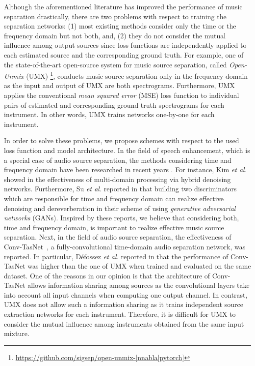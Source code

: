 \documentclass{article}
\begin{document}
Although the aforementioned literature has improved the performance of music separation drastically, there are two problems with respect to training the separation networks: (1) most existing methods consider only the time or the frequency domain but not both, and, (2) they do not consider the mutual influence among output sources since loss functions are independently applied to each estimated source and the corresponding ground truth.
For example, one of the state-of-the-art open-source system for music source separation, called \emph{Open-Unmix} (UMX) \cite{umx}\footnote{\url{https://github.com/sigsep/open-unmix-[nnabla|pytorch]}}, conducts music source separation only in the frequency domain as the input and output of UMX are both spectrograms.
Furthermore, UMX applies the conventional \emph{mean squared error} (MSE) loss function to individual pairs of estimated and corresponding ground truth spectrograms for each instrument.
In other words, UMX trains networks one-by-one for each instrument.

In order to solve these problems, we propose schemes with respect to the used loss function and model architecture.
In the field of speech enhancement, which is a special case of audio source separation, the methods considering time and frequency domain have been researched in recent years \cite{mdphd, hifi_gan}.
For instance, Kim \textit{et al.} showed in \cite{mdphd} the effectiveness of multi-domain processing via hybrid denoising networks.
Furthermore, Su \textit{et al.} reported in \cite{hifi_gan} that building two discriminators which are responsible for time and frequency domain can realize effective denoising and dereverberation in their scheme of using \emph{generative adversarial networks} (GANs).
Inspired by these reports, we believe that considering both, time and frequency domain, is important to realize effective music source separation.
Next, in the field of audio source separation, the effectiveness of Conv-TasNet~\cite{conv_tasnet, conv_tasnet_mss}, a fully-convolutional time-domain audio separation network, was reported.
In particular, D\'{e}fossez \textit{et al.} reported in \cite{conv_tasnet_mss} that the performance of Conv-TasNet was higher than the one of UMX when trained and evaluated on the same dataset.
One of the reasons in our opinion is that the architecture of Conv-TasNet allows information sharing among sources as the convolutional layers take into account all input channels when computing one output channel. 
In contrast, UMX does not allow such a information sharing as it trains independent source extraction networks for each instrument.
Therefore, it is difficult for UMX to consider the mutual influence among instruments obtained from the same input mixture.
\end{document}
